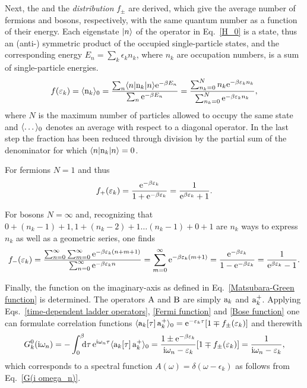Next, the \emph{} and the \emph{
distribution} $f_\pm$ are derived, which give the average number of fermions and
bosons, respectively, with the same quantum number as a function of their
energy. Each eigenstate $|n\rangle$ of the  operator in
Eq.~\ref{H_0} is a  state, thus an (anti-) symmetric product of the
occupied single-particle states, and the corresponding energy $E_n = \sum_k
\epsilon_k n_k$, where $n_k$ are occupation numbers, is a sum of single-particle
energies.
%
\begin{equation*}
    f(\varepsilon_k) = \langle\mathrm n_k\rangle_0
    = \frac{\sum_n \langle n| \mathrm n_k |n\rangle \mathrm e^{-\beta E_n}}
        {\sum_n \mathrm e^{-\beta E_n}}
    = \frac{\sum_{n_k = 0}^N n_k \mathrm e^{-\beta \varepsilon_k n_k}}
        {\sum_{n_k = 0}^N \mathrm e^{-\beta \varepsilon_k n_k}},
\end{equation*}
%
where $N$ is the maximum number of particles allowed to occupy the same state
and $\langle\dots\rangle_0$ denotes an average with respect to a diagonal 
operator. In the last step the fraction has been reduced through division by the
partial sum of the denominator for which $\langle n| \mathrm n_k |n\rangle = 0$.

For fermions $N = 1$ and thus
%
\begin{equation} \label{Fermi function}
    f_+(\varepsilon_k) = \frac{\mathrm e^{-\beta \varepsilon_k}}{1 + \mathrm e^{-\beta \varepsilon_k}}
    = \frac 1 {\mathrm e^{\beta \varepsilon_k} + 1}.
\end{equation}

For bosons $N = \infty$ and, recognizing that $0 + (n_k - 1) + 1, 1 + (n_k - 2)
+ 1 \dots (n_k - 1) + 0 + 1$ are $n_k$ ways to express $n_k$ as well as a
geometric series, one finds
%
\begin{equation} \label{Bose function}
    f_-(\varepsilon_k)
    = \frac {\sum_{n = 0}^\infty \sum_{m = 0}^\infty
        \mathrm e^{-\beta \varepsilon_k (n + m + 1)}}
        {\sum_{n = 0}^\infty \mathrm e^{-\beta \varepsilon_k n}}
    = \sum_{m = 0}^\infty \mathrm e^{-\beta \varepsilon_k (m + 1)}
    = \frac{\mathrm e^{-\beta \varepsilon_k}}{1 - \mathrm e^{-\beta \varepsilon_k}}
    = \frac 1 {\mathrm e^{\beta \varepsilon_k} - 1}.
\end{equation}

Finally, the  function on the imaginary-axis as defined in
Eq.~\ref{Matsubara-Green function} is determined. The operators $\mathrm A$ and $\mathrm
B$ are simply $\mathrm a_k$ and $\mathrm a_k^+$. Applying Eqs.~\ref{time-dependent
ladder operators}, \ref{Fermi function} and \ref{Bose function} one can
formulate correlation functions $\langle\mathrm a_k[\tau] \, \mathrm a_k^+\rangle_0 =
\mathrm e^{-\varepsilon_k \tau} [1 \mp f_\pm(\varepsilon_k)]$ and therewith
%
\begin{equation} \label{G_0(i omega_n)}
    G_k^0(\I \omega_n) = -\int \from 0 \till \beta \D \tau \,
    \E^{\I \omega_n \tau} \av{\op a_k[\tau] \, \op a_k^+}_0
    = \frac{1 \pm \E^{-\beta \epsilon_k}}{\I \omega_n - \epsilon_k}
        [1 \mp f_\pm(\epsilon_k)]
    = \frac 1 {\I \omega_n - \epsilon_k},
\end{equation}
%
which corresponds to a spectral function $A(\omega) = \delta(\omega -
\epsilon_k)$ as follows from Eq.~\ref{G(i omega_n)}.

